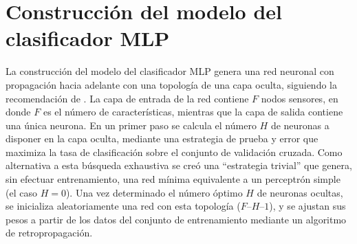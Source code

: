%
%
%
\section{Construcción del modelo del clasificador MLP}
%
La construcción del modelo del clasificador MLP genera una red
neuronal con propagación hacia adelante con una topología de una
capa oculta, siguiendo la recomendación de \cite{nnfaq}.
La capa de entrada de la red contiene $F$ nodos sensores, en donde $F$
es el número de características, mientras que la capa de salida
contiene una única neurona.
En un primer paso se calcula el número $H$ de neuronas a disponer en
la capa oculta, mediante una estrategia de prueba y error que maximiza
la tasa de clasificación sobre el conjunto de validación cruzada.
Como alternativa a esta búsqueda exhaustiva se creó una ``estrategia
trivial'' que genera, sin efectuar entrenamiento, una red mínima
equivalente a un perceptrón simple (el caso $H=0$).
Una vez determinado el número óptimo $H$ de neuronas ocultas, se
inicializa aleatoriamente una red con esta topología ($F$--$H$--$1$),
y se ajustan sus pesos a partir de los datos del conjunto de
entrenamiento mediante un algoritmo de retropropagación.
